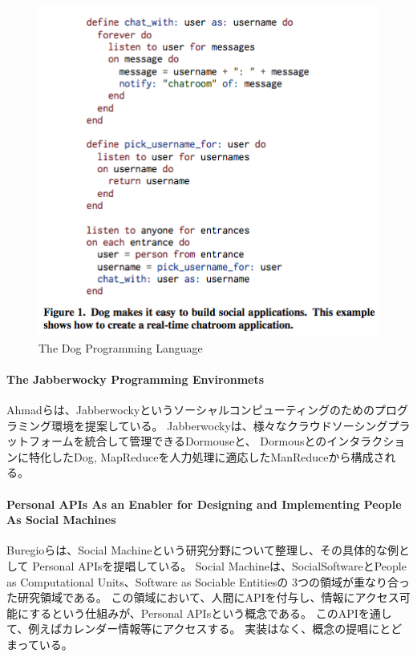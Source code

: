 \begin{figure}[htbp]
  \begin{center}
  \includegraphics[width=.6\linewidth,bb=0 0 426 414]{images/dog.png}
  \end{center}
  \caption{The Dog Programming Language}
  \label{fig:dog}
\end{figure}

\paragraph{The Jabberwocky Programming
Environmets}\label{the-jabberwocky-programming-environmets}

\mbox{}

Ahmadらは、Jabberwockyというソーシャルコンピューティングのためのプログラミング環境を提案している\cite{jabberwocky}。
Jabberwockyは、様々なクラウドソーシングプラットフォームを統合して管理できるDormouseと、
Dormousとのインタラクションに特化したDog,
MapReduceを人力処理に適応したManReduceから構成される。

\paragraph{Personal APIs As an Enabler for Designing and Implementing
People As Social
Machines}\label{personal-apis-as-an-enabler-for-designing-and-implementing-people-as-social-machines}

\mbox{}

Buregioらは、Social
Machine\cite{social-machines}という研究分野について整理し、その具体的な例として
Personal APIs\cite{personal-api}を提唱している。 Social
Machineは、SocialSoftwareとPeople as Computational Units、Software as
Sociable Entitiesの 3つの領域が重なり合った研究領域である。
この領域において、人間にAPIを付与し、情報にアクセス可能にするという仕組みが、Personal
APIsという概念である。
このAPIを通して、例えばカレンダー情報等にアクセスする。
実装はなく、概念の提唱にとどまっている。

